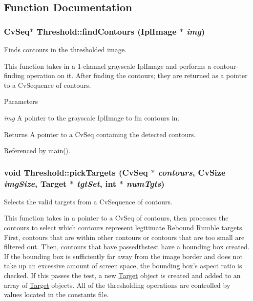 \subsection{Function Documentation}
\hypertarget{namespaceThreshold_aa7e5d8d44e549fadc62258d6fd18b988}{
\subsubsection[{findContours}]{\setlength{\rightskip}{0pt plus 5cm}CvSeq$\ast$ Threshold::findContours (IplImage $\ast$ {\em img})}}
\label{namespaceThreshold_aa7e5d8d44e549fadc62258d6fd18b988}


Finds contours in the thresholded image. 

This function takes in a 1-\/channel grayscale IplImage and performs a contour-\/finding operation on it. After finding the contours; they are returned as a pointer to a CvSequence of contours.


\begin{DoxyParams}{Parameters}
\item[{\em img}]A pointer to the grayscale IplImage to fin contours in. \end{DoxyParams}
\begin{DoxyReturn}{Returns}
A pointer to a CvSeq containing the detected contours. 
\end{DoxyReturn}


Referenced by main().

\hypertarget{namespaceThreshold_a71ea4886f013bfadb7386d7b5ad88661}{
\subsubsection[{pickTargets}]{\setlength{\rightskip}{0pt plus 5cm}void Threshold::pickTargets (CvSeq $\ast$ {\em contours}, \/  CvSize {\em imgSize}, \/  {\bf Target} $\ast$ {\em tgtSet}, \/  int $\ast$ {\em numTgts})}}
\label{namespaceThreshold_a71ea4886f013bfadb7386d7b5ad88661}


Selects the valid targets from a CvSequence of contours. 

This function takes in a pointer to a CvSeq of contours, then processes the contours to select which contours represent legitimate Rebound Rumble targets. First, contours that are within other contours or contours that are too small are filtered out. Then, contours that have passedthstest have a bounding box created. If the bounding box is sufficiently far away from the image border and does not take up an excessive amount of screen space, the bounding box's aspect ratio is checked. If this passes the test, a new \hyperlink{classTarget}{Target} object is created and added to an array of \hyperlink{classTarget}{Target} objects. All of the thresholding operations are controlled by values located in the constants file.


